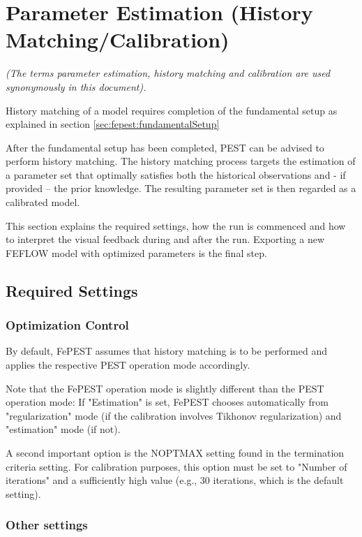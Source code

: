 \chapter{Parameter Estimation (History Matching/Calibration)}
\label{sec:fepest:parameterEstimation}

\textit{(The terms parameter estimation, history matching and calibration are used synonymously in this document).}

History matching of a model requires completion of the fundamental setup as explained in section \ref{sec:fepest:fundamentalSetup}

After the fundamental setup has been completed, PEST can be advised to perform history matching.
The history matching process targets the estimation of a parameter set that optimally satisfies both the historical observations and - if provided – the prior knowledge. The resulting parameter set is then regarded as a calibrated model.

This section explains the required settings, how the run is commenced and how to interpret the visual feedback during and after the run. Exporting a new FEFLOW model with optimized parameters is the final step.

\section{Required Settings}

\subsection{Optimization Control}

By default, FePEST assumes that history matching is to be performed and applies the respective PEST operation mode accordingly.

Note that the FePEST operation mode is slightly different than the PEST operation mode: If "Estimation" is set, FePEST chooses automatically from "regularization" mode (if the calibration involves Tikhonov regularization) and "estimation" mode (if not). 

A second important option is the NOPTMAX setting found in the termination criteria setting. For calibration purposes, this option must be set to "Number of iterations" and a sufficiently high value (e.g., 30 iterations, which is the default setting).

\subsection{Other settings}

